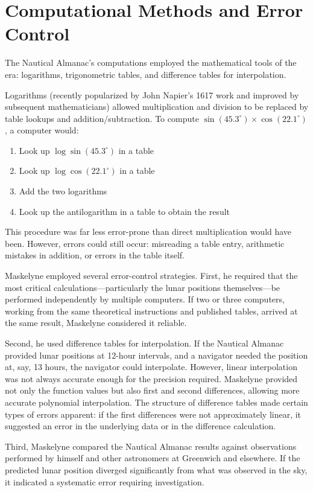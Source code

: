 \section{Computational Methods and Error Control}

The Nautical Almanac's computations employed the mathematical tools of the era: logarithms, trigonometric tables, and difference tables for interpolation.

Logarithms (recently popularized by John Napier's 1617 work and improved by subsequent mathematicians) allowed multiplication and division to be replaced by table lookups and addition/subtraction. To compute $\sin(45.3^{\circ}) \times \cos(22.1^{\circ})$, a computer would:
\begin{enumerate}
\item Look up $\log \sin(45.3^{\circ})$ in a table
\item Look up $\log \cos(22.1^{\circ})$ in a table
\item Add the two logarithms
\item Look up the antilogarithm in a table to obtain the result
\end{enumerate}

This procedure was far less error-prone than direct multiplication would have been. However, errors could still occur: misreading a table entry, arithmetic mistakes in addition, or errors in the table itself.

Maskelyne employed several error-control strategies. First, he required that the most critical calculations—particularly the lunar positions themselves—be performed independently by multiple computers. If two or three computers, working from the same theoretical instructions and published tables, arrived at the same result, Maskelyne considered it reliable.

Second, he used difference tables for interpolation. If the Nautical Almanac provided lunar positions at 12-hour intervals, and a navigator needed the position at, say, 13 hours, the navigator could interpolate. However, linear interpolation was not always accurate enough for the precision required. Maskelyne provided not only the function values but also first and second differences, allowing more accurate polynomial interpolation. The structure of difference tables made certain types of errors apparent: if the first differences were not approximately linear, it suggested an error in the underlying data or in the difference calculation.

Third, Maskelyne compared the Nautical Almanac results against observations performed by himself and other astronomers at Greenwich and elsewhere. If the predicted lunar position diverged significantly from what was observed in the sky, it indicated a systematic error requiring investigation.

